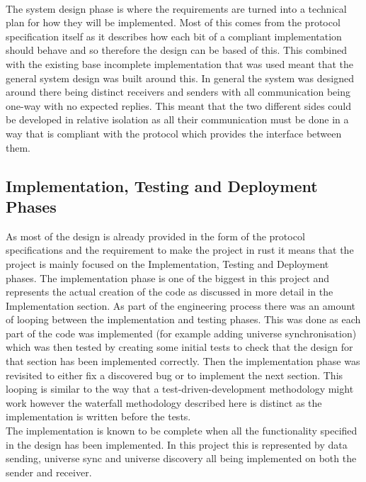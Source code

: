\documentclass[11pt,a4paper]{report}
\begin{document}
\paragraph*{}
The system design phase is where the requirements are turned into a technical plan for how they will be implemented. Most of this comes from the protocol specification itself as it describes how each bit of a compliant implementation should behave and so therefore the design can be based of this. This combined with the existing base incomplete implementation that was used meant that the general system design was built around this. In general the system was designed around there being distinct receivers and senders with all communication being one-way with no expected replies. This meant that the two different sides could be developed in relative isolation as all their communication must be done in a way that is compliant with the protocol which provides the interface between them.

\subsection{Implementation, Testing and Deployment Phases}
As most of the design is already provided in the form of the protocol specifications and the requirement to make the project in rust it means that the project is mainly focused on the Implementation, Testing and Deployment phases. The implementation phase is one of the biggest in this project and represents the actual creation of the code as discussed in more detail in the Implementation section. As part of the engineering process there was an amount of looping between the implementation and testing phases. This was done as each part of the code was implemented (for example adding universe synchronisation) which was then tested by creating some initial tests to check that the design for that section has been implemented correctly. Then the implementation phase was revisited to either fix a discovered bug or to implement the next section. This looping is similar to the way that a test-driven-development methodology might work however the waterfall methodology described here is distinct as the implementation is written before the tests.\\

The implementation is known to be complete when all the functionality specified in the design has been implemented. In this project this is represented by data sending, universe sync and universe discovery all being implemented on both the sender and receiver. 
\end{document}
